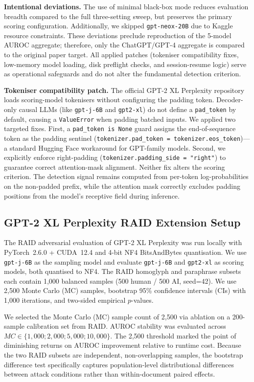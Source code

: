 \documentclass[conference]{IEEEtran}
\begin{document}
\textbf{Intentional deviations.} The use of minimal black-box mode reduces
evaluation breadth compared to the full three-setting sweep, but preserves
the primary scoring configuration. Additionally, we skipped \texttt{gpt-neox-20B}
due to Kaggle resource constraints. These deviations preclude reproduction
of the 5-model AUROC aggregate; therefore, only the ChatGPT/GPT-4 aggregate
is compared to the original paper target. All applied patches (tokeniser
compatibility fixes, low-memory model loading, disk preflight checks, and
session-resume logic) serve as operational safeguards and do not alter the
fundamental detection criterion.

\textbf{Tokeniser compatibility patch.} The official GPT-2 XL Perplexity
repository loads scoring-model tokenisers without configuring the padding
token. Decoder-only causal LLMs (like \texttt{gpt-j-6B} and \texttt{gpt2-xl})
do not define a \texttt{pad\_token} by default, causing a \texttt{ValueError}
when padding batched inputs. We applied two targeted fixes. First, a
\texttt{pad\_token is None} guard assigns the end-of-sequence token as the
padding sentinel (\texttt{tokenizer.pad\_token = tokenizer.eos\_token})---a
standard Hugging Face workaround for GPT-family models. Second, we explicitly
enforce right-padding (\texttt{tokenizer.padding\_side = "right"}) to guarantee
correct attention-mask alignment. Neither fix alters the scoring criterion.
The detection signal remains computed from per-token log-probabilities on the
non-padded prefix, while the attention mask correctly excludes padding positions
from the model's receptive field during inference.

\subsection{GPT-2 XL Perplexity RAID Extension Setup}
\label{ssec:raidsetup}

The RAID adversarial evaluation of GPT-2 XL Perplexity was run locally with
PyTorch~2.6.0 + CUDA~12.4 and 4-bit NF4 BitsAndBytes quantisation. We use
\texttt{gpt-j-6B} as the sampling model and evaluate \texttt{gpt-j-6B} and
\texttt{gpt2-xl} as scoring models, both quantised to NF4. The RAID homoglyph
and paraphrase subsets each contain 1,000 balanced samples (500 human / 500 AI,
seed=42). We use 2,500 Monte Carlo (MC) samples, bootstrap 95\% confidence intervals (CIs) with 1,000 iterations,
and two-sided empirical $p$-values.

We selected the Monte Carlo (MC) sample count of 2,500 via ablation on a
200-sample calibration set from RAID. AUROC stability was evaluated across
$MC \in \{1,000; 2,000; 5,000; 10,000\}$. The 2,500 threshold marked the
point of diminishing returns on AUROC improvement relative to runtime cost.
Because the two RAID subsets are independent, non-overlapping samples, the
bootstrap difference test specifically captures population-level
distributional differences between attack conditions rather than
within-document paired effects.
\end{document}
